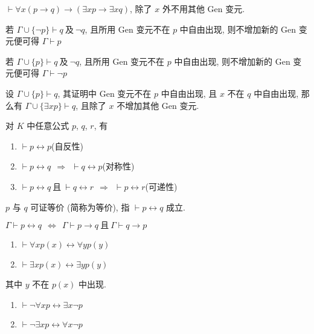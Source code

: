 \documentclass[
    color=black,
    device=normal,
    lang=cn
]{elegantnote}
\begin{document}
\begin{proposition}
    $\vdash \forall x(p\to q)\to (\exists xp\to \exists xq)$, 除了 $x$ 外不用其他 Gen 变元.
\end{proposition}
\begin{theorem}[反证律]
    若 $\Gamma\cup\{\lnot p\}\vdash q\ \text{及}\ \lnot q$, 且所用 Gen 变元不在 $p$ 中自由出现, 则不增加新的 Gen 变元便可得 $\Gamma \vdash p$
\end{theorem}
\begin{theorem}[归谬律]
    若 $\Gamma\cup\{p\}\vdash q\ \text{及}\ \lnot q$, 且所用 Gen 变元不在 $p$ 中自由出现, 则不增加新的 Gen 变元便可得 $\Gamma \vdash\lnot p$
\end{theorem}
\begin{proposition}[$\exists_2$ 规则]
    设 $\Gamma\cup\{p\}\vdash q$, 其证明中 Gen 变元不在 $p$ 中自由出现, 且 $x$ 不在 $q$ 中自由出现, 那么有 $\Gamma\cup\{\exists xp\}\vdash q$, 且除了 $x$ 不增加其他 Gen 变元.
\end{proposition}
\begin{proposition}
    对 $K$ 中任意公式 $p$, $q$, $r$, 有
    \begin{enumerate}[label = $\arabic*^\circ$]
        \item $\vdash p\leftrightarrow p$\hfill (自反性)
        \item $\vdash p\leftrightarrow q\ \ \Rightarrow\ \ \vdash q\leftrightarrow p$\hfill (对称性)
        \item $\vdash p\leftrightarrow q\ \text{且}\ \vdash q\leftrightarrow r\ \ \Rightarrow\ \ \vdash p\leftrightarrow r$\hfill (可递性)
    \end{enumerate}
\end{proposition}
\begin{definition}[可证等价]
    $p$ 与 $q$ 可证等价 (简称为等价), 指 $\vdash p\leftrightarrow q$ 成立.
\end{definition}
\begin{proposition}
    $\Gamma\vdash p\leftrightarrow q\ \ \Leftrightarrow\ \ \Gamma\vdash p\to q\ \text{且}\ \Gamma\vdash q\to p$
\end{proposition}
\begin{proposition}
    \hfill
    \begin{enumerate}[label = $\arabic*^\circ$]
        \item $\vdash \forall x p(x)\leftrightarrow \forall y p(y)$
        \item $\vdash \exists x p(x)\leftrightarrow \exists y p(y)$
    \end{enumerate}
    其中 $y$ 不在 $p(x)$ 中出现.
\end{proposition}
\begin{proposition}
    \hfill
    \begin{enumerate}[label = $\arabic*^\circ$]
        \item $\vdash \lnot \forall x p\leftrightarrow \exists x\lnot p$
        \item $\vdash \lnot \exists x p\leftrightarrow \forall x\lnot p$
    \end{enumerate}
\end{proposition}
\end{document}
